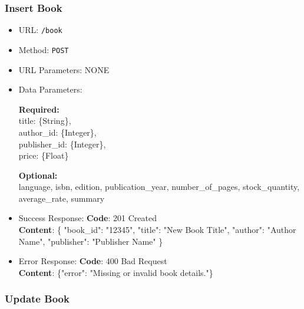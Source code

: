 \subsubsection*{Insert Book}

\begin{itemize}
    \item URL: \texttt{/book}
    \item Method: \texttt{POST}
    \item URL Parameters: NONE
    \item Data Parameters:

    \textbf{Required:} \\
    title: \{String\}, \\
    author\_id: \{Integer\}, \\
    publisher\_id: \{Integer\}, \\
    price: \{Float\}

    \textbf{Optional:} \\
    language, isbn, edition, publication\_year, number\_of\_pages, stock\_quantity, average\_rate, summary

    \item Success Response: \newline
    \textbf{Code}: 201 Created \\
    \textbf{Content}: \{ "book\_id": "12345", "title": "New Book Title", "author": "Author Name", "publisher": "Publisher Name" \}

    \item Error Response: \newline
    \textbf{Code}: 400 Bad Request \\
    \textbf{Content}: \{"error": "Missing or invalid book details."\}
\end{itemize}

\subsubsection*{Update Book}

